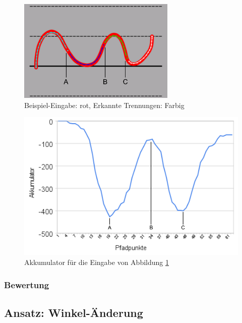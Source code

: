 \begin{figure}[h!]
  \centering
    \includegraphics[width=0.67\textwidth]{./img/akkumulator_beispiel.pdf}
  \caption{Beispiel-Eingabe: rot, Erkannte Trennungen: Farbig}
  \label{drehrichtungBeispiel}
\end{figure}

\begin{figure}[h!]
  \centering
    \includegraphics[width=1.0\textwidth]{./img/akkumulator_diagramm.pdf}
  \caption{Akkumulator für die Eingabe von Abbildung \ref{drehrichtungBeispiel}}
  \label{akkumulatorDiagramm}
\end{figure}

\subsubsection{Bewertung}



\subsection{Ansatz: Winkel-Änderung}

